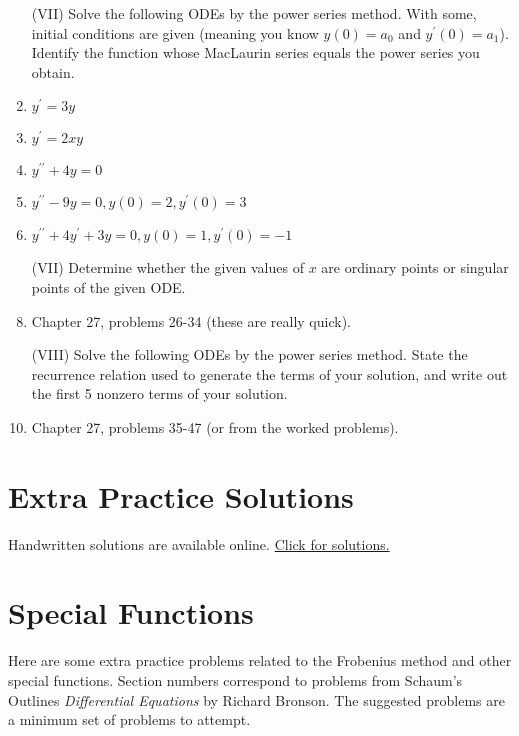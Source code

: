 \begin{multicols}{2}
\begin{enumerate}
\item [(VII)] Solve the following ODEs by the power series method. With some, initial conditions are given (meaning you know $y(0)=a_0$ and $y^\prime(0)=a_1$). Identify the function whose MacLaurin series equals the power series you obtain.
\item $y^{\prime}=3y$
\item $y^{\prime}=2xy$
\item $y^{\prime\prime}+4y=0$
\item $y^{\prime\prime}-9y=0, y(0)=2, y^\prime(0)=3$
\item $y^{\prime\prime}+4y^{\prime}+3y=0, y(0)=1, y^\prime(0)=-1$



\item [(VII)] Determine whether the given values of $x$ are ordinary points or singular points of the given ODE.
\item Chapter 27, problems 26-34 (these are really quick).


\item [(VIII)] Solve the following ODEs by the power series method.  State the recurrence relation used to generate the terms of your solution, and write out the first 5 nonzero terms of your solution.
\item Chapter 27, problems 35-47 (or from the worked problems).






\end{enumerate}
\end{multicols}

\section{Extra Practice Solutions}
Handwritten solutions are available online.  \href{https://content.byui.edu/file/664390b8-e9cc-43a4-9f3c-70362f8b9735/1/08-Power-Series-Preparation-Solutions.pdf}{Click for solutions.}

\section{Special Functions}
Here are some extra practice problems related to the Frobenius method and other special functions. Section numbers correspond to problems from Schaum's Outlines \textit{Differential Equations} by Richard Bronson. The suggested problems are a minimum set of problems to attempt. 

